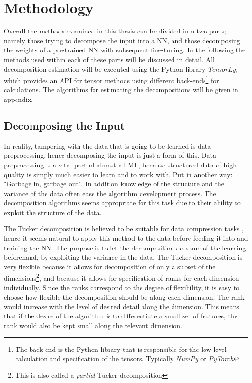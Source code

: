 \section{Methodology}
Overall the methods examined in this thesis can be divided into two parts; namely those trying to decompose the input into a NN, and those decomposing the weights of a pre-trained NN with subsequent fine-tuning. In the following the methods used within each of these parts will be discussed in detail. All decomposition estimation will be executed using the Python library \textit{TensorLy}\cite{tensorly}, which provides an API for tensor methods using different back-ends\footnote{The back-end is the Python library that is responsible for the low-level calculation and specification of the tensors. Typically \textit{NumPy}\cite{numpy} or \textit{PyTorch}\cite{pytorch}} for calculations. The algorithms for estimating the decompositions will be given in appendix. 

\subsection{Decomposing the Input}
In reality, tampering with the data that is going to be learned is data preprocessing, hence decomposing the input is just a form of this. Data preprocessing is a vital part of almost all ML, because structured data of high quality is simply much easier to learn and to work with. Put in another way: "Garbage in, garbage out". In addition knowledge of the structure and the variance of the data often ease the algorithm development process. The decomposition algorithms seems appropriate for this task due to their ability to exploit the structure of the data. 

The Tucker decomposition is believed to be suitable for data compression tasks \cite{Mørup2011}, hence it seems natural to apply this method to the data before feeding it into and training the NN. The purpose is to let the decomposition do some of the learning beforehand, by exploiting the variance in the data. The Tucker-decomposition is very flexible because it allows for decomposition of only a subset of the dimensions\footnote{This is also called a \textit{partial} Tucker decomposition}, and because it allows for specification of ranks for each dimension individually. Since the ranks correspond to the degree of flexibility, it is easy to choose how flexible the decomposition should be along each dimension. The rank would increase with the level of desired detail along the dimension. This means that if the desire of the algorithm is to differentiate a small set of features, the rank would also be kept small along the relevant dimension.

